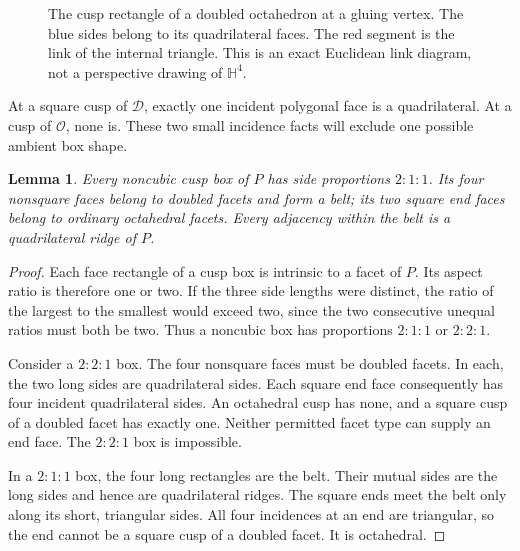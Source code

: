 \documentclass[11pt]{article}
\newtheorem{lemma}[theorem]{Lemma}
\theoremstyle{remark}
\newcommand{\HH}{\mathbb H}
\newcommand{\OCT}{\mathcal O}
\newcommand{\DBL}{\mathcal D}
\begin{document}
\begin{figure}[htbp]
\centering
{}
\caption{The cusp rectangle of a doubled octahedron at a gluing
vertex. The blue sides belong to its quadrilateral faces. The red
segment is the link of the internal triangle. This is an exact
Euclidean link diagram, not a perspective drawing of $\HH^4$.}
\label{fig:rectangle}
\end{figure}

At a square cusp of $\DBL$, exactly one incident polygonal face
is a quadrilateral. At a cusp of $\OCT$, none is. These two small
incidence facts will exclude one possible ambient box shape.

\begin{lemma}\label{lem:box}
Every noncubic cusp box of $P$ has side proportions $2:1:1$.
Its four nonsquare faces belong to doubled facets and form a belt;
its two square end faces belong to ordinary octahedral facets.
Every adjacency within the belt is a quadrilateral ridge of $P$.
\end{lemma}
\begin{proof}
Each face rectangle of a cusp box is intrinsic to a facet of $P$.
Its aspect ratio is therefore one or two. If the three side lengths
were distinct, the ratio of the largest to the smallest would exceed
two, since the two consecutive unequal ratios must both be two.
Thus a noncubic box has proportions $2:1:1$ or $2:2:1$.

Consider a $2:2:1$ box. The four nonsquare faces must be doubled
facets. In each, the two long sides are quadrilateral sides. Each
square end face consequently has four incident quadrilateral sides.
An octahedral cusp has none, and a square cusp of a doubled facet
has exactly one. Neither permitted facet type can supply an end
face. The $2:2:1$ box is impossible.

In a $2:1:1$ box, the four long rectangles are the belt. Their
mutual sides are the long sides and hence are quadrilateral ridges.
The square ends meet the belt only along its short, triangular
sides. All four incidences at an end are triangular, so the end
cannot be a square cusp of a doubled facet. It is octahedral.
\end{proof}
\end{document}
